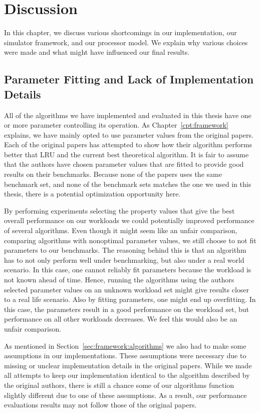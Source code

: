 
\chapter{Discussion}
\label{cpt:discussion}

In this chapter, we discuss various shortcomings in our implementation, our simulator framework, and our processor model.
We explain why various choices were made and what might have influenced our final results.

\section{Parameter Fitting and Lack of Implementation Details}

All of the algorithms we have implemented and evaluated in this thesis have one or more parameter controlling its operation.
As Chapter~\ref{cpt:framework} explains, we have mainly opted to use parameter values from the original papers.
Each of the original papers has attempted to show how their algorithm performs better that LRU and the current best theoretical algorithm.
It is fair to assume that the authors have chosen parameter values that are fitted to provide good results on their benchmarks.
Because none of the papers uses the same benchmark set, and none of the benchmark sets matches the one we used in this thesis, there is a potential optimization opportunity here.

By performing experiments selecting the property values that give the best overall performance on our workloads we could potentially improved performance of several algorithms.
Even though it might seem like an unfair comparison, comparing algorithms with nonoptimal parameter values, we still choose to not fit parameters to our benchmarks.
The reasoning behind this is that an algorithm has to not only perform well under benchmarking, but also under a real world scenario.
In this case, one cannot reliably fit parameters because the workload is not known ahead of time.
Hence, running the algorithms using the authors selected parameter values on an unknown workload set might give results closer to a real life scenario.
Also by fitting parameters, one might end up overfitting.
In this case, the parameters result in a good performance on the workload set, but performance on all other workloads decreases.
We feel this would also be an unfair comparison.

As mentioned in Section~\ref{sec:framework:algorithms} we also had to make some assumptions in our implementations.
These assumptions were necessary due to missing or unclear implementation details in the original papers.
While we made all attempts to keep our implementation identical to the algorithm described by the original authors, there is still a chance some of our algorithms function slightly different due to one of these assumptions.
As a result, our performance evaluations results may not follow those of the original papers.



